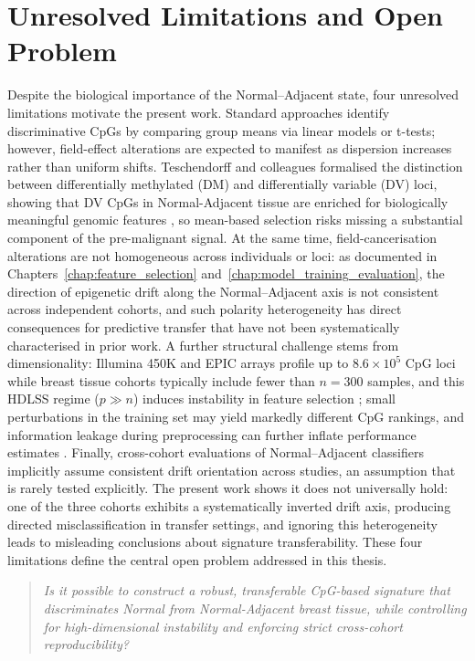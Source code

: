\section{Unresolved Limitations and Open Problem}

Despite the biological importance of the Normal--Adjacent state,
four unresolved limitations motivate the present work.
Standard approaches identify discriminative CpGs by comparing group means via
linear models or t-tests; however, field-effect alterations are expected to
manifest as dispersion increases rather than uniform shifts.
Teschendorff and colleagues formalised the distinction between differentially
methylated (DM) and differentially variable (DV) loci, showing that DV CpGs
in Normal-Adjacent tissue are enriched for biologically meaningful genomic
features \cite{Teschendorff2016fielddefects, Teschendorff2014}, so mean-based selection
risks missing a substantial component of the pre-malignant signal.
At the same time, field-cancerisation alterations are not homogeneous across
individuals or loci: as documented in Chapters~\ref{chap:feature_selection}
and~\ref{chap:model_training_evaluation}, the direction of epigenetic drift
along the Normal--Adjacent axis is not consistent across independent cohorts,
and such polarity heterogeneity has direct consequences for predictive transfer
that have not been systematically characterised in prior work.
A further structural challenge stems from dimensionality: Illumina 450K and
EPIC arrays profile up to $8.6 \times 10^5$ CpG loci while breast tissue
cohorts typically include fewer than $n = 300$ samples, and this HDLSS regime
($p \gg n$) induces instability in feature selection \cite{Meinshausen2010};
small perturbations in the training set may yield markedly different CpG
rankings, and information leakage during preprocessing can further inflate
performance estimates \cite{Ambroise2002}.
Finally, cross-cohort evaluations of Normal--Adjacent classifiers implicitly
assume consistent drift orientation across studies, an assumption that is rarely
tested explicitly. The present work shows it does not universally hold: one of
the three cohorts exhibits a systematically inverted drift axis, producing
directed misclassification in transfer settings, and ignoring this heterogeneity
leads to misleading conclusions about signature transferability. These four limitations define the central open problem
addressed in this thesis.

\begin{quote}
\textit{Is it possible to construct a robust, transferable
CpG-based signature that discriminates Normal from
Normal-Adjacent breast tissue, while controlling for
high-dimensional instability and enforcing strict
cross-cohort reproducibility?}
\end{quote}


